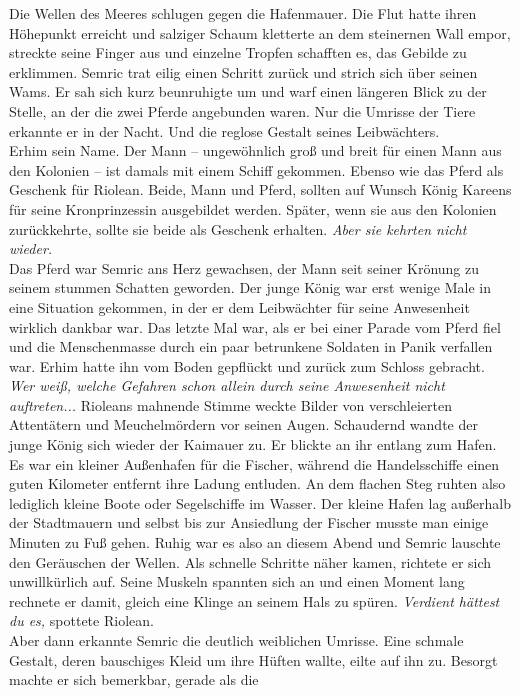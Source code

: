 Die Wellen des Meeres schlugen gegen die Hafenmauer. Die Flut hatte ihren Höhepunkt erreicht und 
salziger Schaum kletterte an dem steinernen Wall empor, streckte seine Finger aus und einzelne 
Tropfen schafften es, das Gebilde zu erklimmen. Semric trat eilig einen Schritt zurück und strich 
sich über seinen Wams. Er sah sich kurz beunruhigte um und warf einen längeren Blick zu der Stelle, 
an der die zwei Pferde angebunden waren. Nur die Umrisse der Tiere erkannte er in der Nacht. Und 
die reglose Gestalt seines Leibwächters. \\
Erhim sein Name. Der Mann – ungewöhnlich groß und breit für einen Mann aus den Kolonien – ist 
damals mit einem Schiff gekommen. Ebenso wie das Pferd als Geschenk für Riolean. Beide, Mann und 
Pferd, sollten auf Wunsch König Kareens für seine Kronprinzessin ausgebildet werden. Später, wenn 
sie aus den Kolonien zurückkehrte, sollte sie beide als Geschenk erhalten. \textit{Aber sie kehrten 
nicht wieder.}\\
Das Pferd war Semric ans Herz gewachsen, der Mann seit seiner Krönung zu seinem stummen Schatten 
geworden. Der junge König war erst wenige Male in eine Situation gekommen, in der er dem 
Leibwächter für seine Anwesenheit wirklich dankbar war. Das letzte Mal war, als er bei einer Parade 
vom Pferd fiel und die Menschenmasse durch ein paar betrunkene Soldaten in Panik verfallen war. 
Erhim hatte ihn vom Boden gepflückt und zurück zum Schloss gebracht. \textit{Wer weiß, welche 
Gefahren schon allein durch seine Anwesenheit nicht auftreten...} Rioleans mahnende Stimme weckte 
Bilder von verschleierten Attentätern und Meuchelmördern vor seinen Augen. Schaudernd wandte der 
junge König sich wieder der Kaimauer zu. Er blickte an ihr entlang zum Hafen. Es war ein kleiner 
Außenhafen für die Fischer, während die Handelsschiffe einen guten Kilometer entfernt ihre Ladung 
entluden. An dem flachen Steg ruhten also lediglich kleine Boote oder Segelschiffe im Wasser. Der 
kleine Hafen lag außerhalb der Stadtmauern und selbst bis zur Ansiedlung der Fischer musste man 
einige Minuten zu Fuß gehen. Ruhig war es also an diesem Abend und Semric lauschte den Geräuschen 
der Wellen. Als schnelle Schritte näher kamen, richtete er sich unwillkürlich auf. Seine Muskeln 
spannten sich an und einen Moment lang rechnete er damit, gleich eine Klinge an seinem Hals zu 
spüren. \textit{Verdient hättest du es,} spottete Riolean.\\
Aber dann erkannte Semric die deutlich weiblichen Umrisse. Eine schmale Gestalt, deren bauschiges 
Kleid um ihre Hüften wallte, eilte auf ihn zu. Besorgt machte er sich bemerkbar, gerade als die 

